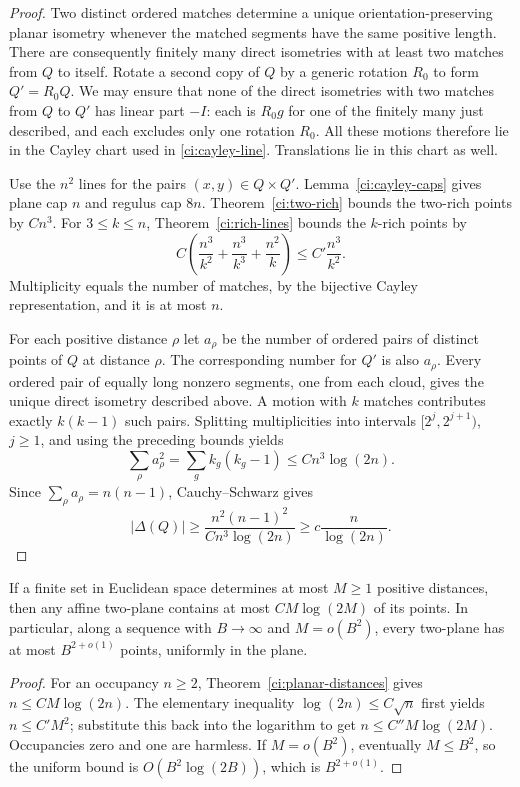 \begin{proof}
Two distinct ordered matches determine a unique orientation-preserving
planar isometry whenever the matched segments have the same positive
length.  There are consequently finitely many direct isometries
with at least two matches from $Q$ to itself.  Rotate a second copy
of $Q$ by a generic rotation $R_0$ to form $Q'=R_0Q$.  We may
ensure that none of the direct isometries with two matches from
$Q$ to $Q'$ has linear part $-I$: each is $R_0g$ for one of the
finitely many just described, and each excludes only one rotation
$R_0$.  All these motions therefore lie in the Cayley chart used
in \eqref{ci:cayley-line}.  Translations lie in this chart as well.

Use the $n^2$ lines for the pairs $(x,y)\in Q\times Q'$.
Lemma~\ref{ci:cayley-caps} gives plane cap $n$ and regulus cap
$8n$.  Theorem~\ref{ci:two-rich} bounds the two-rich points by
$Cn^3$.  For $3\le k\le n$, Theorem~\ref{ci:rich-lines} bounds
the $k$-rich points by
\[
 C\left(\frac{n^3}{k^2}+\frac{n^3}{k^3}+\frac{n^2}{k}\right)
 \le C'\frac{n^3}{k^2}.
\]
Multiplicity equals the number of matches, by the bijective
Cayley representation, and it is at most $n$.

For each positive distance $\rho$ let $a_\rho$ be the number of
ordered pairs of distinct points of $Q$ at distance $\rho$.
The corresponding number for $Q'$ is also $a_\rho$.  Every
ordered pair of equally long nonzero segments, one from each
cloud, gives the unique direct isometry described above.  A motion
with $k$ matches contributes exactly $k(k-1)$ such pairs.
Splitting multiplicities into intervals $[2^j,2^{j+1})$, $j\ge1$,
and using the preceding bounds yields
\[
 \sum_\rho a_\rho^2
   =\sum_g k_g(k_g-1)
   \le C n^3\log(2n).
\]
Since $\sum_\rho a_\rho=n(n-1)$, Cauchy--Schwarz gives
\[
 |\Delta(Q)|\ge
 \frac{n^2(n-1)^2}{Cn^3\log(2n)}
 \ge c\frac n{\log(2n)}.
\]
\end{proof}

\begin{corollary}\label{ci:planar-occupancy}
If a finite set in Euclidean space determines at most $M\ge1$ positive
distances, then any affine two-plane contains at most
$CM\log(2M)$ of its points.  In particular, along a sequence with
$B\longrightarrow\infty$ and $M=o(B^2)$, every two-plane has at
most $B^{2+o(1)}$ points, uniformly in the plane.
\end{corollary}

\begin{proof}
For an occupancy $n\ge2$, Theorem~\ref{ci:planar-distances} gives
$n\le CM\log(2n)$.  The elementary inequality
$\log(2n)\le C\sqrt n$ first yields $n\le C'M^2$; substitute
this back into the logarithm to get $n\le C''M\log(2M)$.
Occupancies zero and one are harmless.  If $M=o(B^2)$, eventually
$M\le B^2$, so the uniform bound is $O(B^2\log(2B))$, which is
$B^{2+o(1)}$.
\end{proof}
